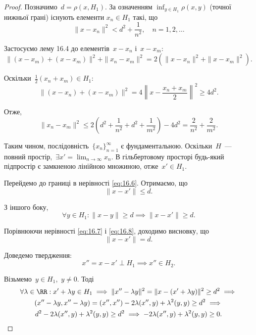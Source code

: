 \begin{proof}
Позначимо~$d = \rho(x, H_1)$. За означенням
$\inf_{y \in H_1} \rho(x, y)$ (точної нижньої грані) існують елементи
$x_n \in H_1$ такі, що
\begin{equation}
    \label{eq:16.6}
    \|x - x_n\|^2 < d^2 + \frac{1}{n^2}, \quad n = 1, 2, \dots
\end{equation}

Застосуємо лему 16.4 до елементів~$x - x_n$ і~$x - x_m$:
\begin{equation*}
    \|(x - x_m) + (x - x_m)\|^2 + \|x_n - x_m\|^2 =
    2 (\|x - x_n\|^2 + \|x - x_m\|^2).
\end{equation*}

Оскільки~$\frac{1}{2}(x_n + x_m) \in H_1$:
\begin{equation*}
    \|(x - x_n) + (x - x_m)\|^2 =
    4 \left\| x - \frac{x_n + x_m}{2} \right\|^2 \ge
    4 d^2.
\end{equation*}

Отже,
\begin{equation*}
    \|x_n - x_m\|^2 \le
    2 \left(d^2 + \frac{1}{n^2} + d^2 + \frac{1}{m^2} \right) - 4 d^2 =
    \frac{2}{n^2} + \frac{2}{m^2}.
\end{equation*}

Таким чином, послідовність~$\{x_n\}_{n = 1}^\infty$ є фундаментальною.
Оскільки~$H$~--- повний простір,~$\exists x' = \lim_{n \to \infty} x_n$.
В гільбертовому просторі будь-який підпростір є замкненою
лінійною множиною, отже~$x' \in H_1$.

Перейдемо до границі в нерівності \eqref{eq:16.6}. Отримаємо, що
\begin{equation}
    \label{eq:16.7}
    \|x - x'\| \le d.
\end{equation}

З іншого боку,
\begin{equation}
    \label{eq:16.8}
    \forall y \in H_1: \|x - y\| \ge d \implies \|x - x'\| \ge d.
\end{equation}

Порівнюючи нерівності \eqref{eq:16.7} і \eqref{eq:16.8}, доходимо висновку, що
\begin{equation*}
    \|x - x'\| = d.
\end{equation*}

Доведемо твердження:
\begin{equation*}
    x'' = x - x' \perp H_1 \implies x'' \in H_2.
\end{equation*}

Візьмемо~$y \in H_1$,~$y \ne 0$. Тоді
\begin{multline*}
    \forall \lambda \in \RR:
    x' + \lambda y \in H_1 \implies
    \|x'' - \lambda y\|^2 = \|x - (x' + \lambda y)\|^2 \ge d^2 \implies \\
    (x'' - \lambda y, x'' - \lambda y) = (x'', x'') - 2 \lambda (x'', y) + \lambda^2 (y, y) \ge d^2 \implies \\
    d^2 - 2 \lambda (x'', y) + \lambda^2 (y, y) \ge d^2 \implies
    - 2 \lambda (x'', y) + \lambda^2 (y, y) \ge 0.
\end{multline*}


\end{proof}
